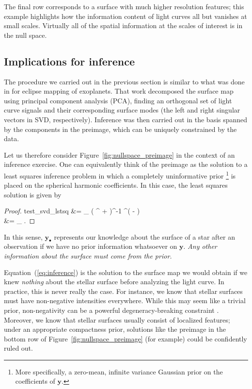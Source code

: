 \documentclass[modern]{aastex62}
\begin{document}
The final row corresponds to a surface with much higher resolution
features; this example highlights how the information content of
light curves all but vanishes at small scales. Virtually all of the
spatial information at the scales of interest is in the null space.

\subsection{Implications for inference}
%
The procedure we carried out in the previous section is similar to what was done in \citet{Rauscher2018}
for eclipse mapping of exoplanets. That work decomposed the surface map
using principal component analysis (PCA), finding an orthogonal set of
light curve signals and their corresponding surface modes (the left and right
singular vectors in SVD, respectively). Inference was then carried out in
the basis spanned by the components in the preimage, which can be uniquely
constrained by the data.

Let us therefore consider Figure~\ref{fig:nullspace_preimage} in the
context of an inference exercise. One can equivalently think of
the preimage as the solution to a least squares inference problem
in which a completely uninformative prior%
\footnote{%
    More specifically, a zero-mean, infinite variance Gaussian prior on the coefficients of $\mathbf{y}$.
}
is placed on the spherical harmonic
coefficients. In this case, the least squares solution is given by
%
\begin{proof}{test_svd_lstsq}
    \label{eq:inference}
    &=
    \lim_{\lambda {}} \left( ^\top {} + \lambda {}\right)^{-1} ^\top ( - )
    \nonumber\\
    &= _\bullet
    \quad.
\end{proof}
%
In this sense, $\mathbf{y}_\bullet$ represents our knowledge about the
surface of a star after an observation if we have no prior information
whatsoever on $\mathbf{y}$.
\emph{Any other information about the surface must come from the prior.}%

Equation~(\ref{eq:inference}) is the solution to the surface map
we would obtain if we knew \emph{nothing} about the stellar surface
before analyzing the light curve. In practice, this is never really
the case. For instance, we know that stellar surfaces
must have non-negative intensities everywhere. While this may seem
like a trivial prior, non-negativity can be a powerful degeneracy-breaking
constraint \citep[e.g.,][]{Fienup1982}. Moreover, we know that
stellar surfaces usually consist of localized features; under an
appropriate compactness prior, solutions
like the preimage in the bottom row of
Figure~\ref{fig:nullspace_preimage} (for example) could be
confidently ruled out.
\end{document}
